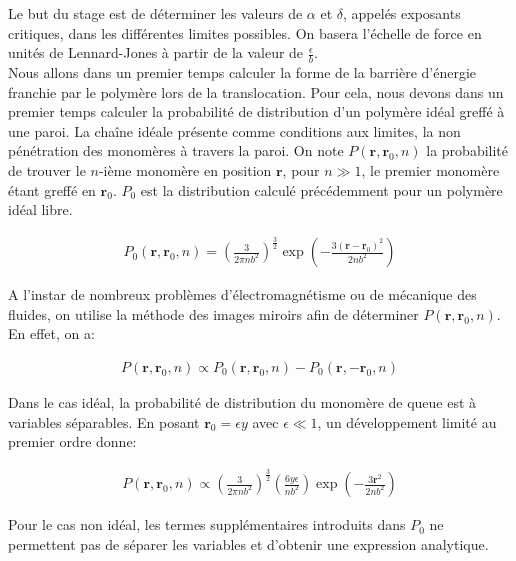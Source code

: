 \documentclass[a4paper,11pt]{article}
\begin{document}
 Le but du stage est de déterminer les valeurs de $\alpha$ et $\delta$, appelés exposants critiques, dans les différentes limites possibles. On basera l'échelle de force en unités de Lennard-Jones à partir de la valeur de $\frac{\epsilon}{b}$.\\

Nous allons dans un premier temps calculer la forme de la barrière d'énergie franchie par le polymère lors de la translocation. Pour cela, nous devons dans un premier temps calculer la probabilité de distribution d'un polymère idéal greffé à une paroi. La chaîne idéale présente comme conditions aux limites, la non pénétration des monomères à travers la paroi. On note $P(\textbf{r},\textbf{r}_0,n)$ la probabilité de trouver le $n$-ième monomère en position $\textbf{r}$, pour $n \gg 1$, le premier monomère étant greffé en $\textbf{r}_0$. $P_0$ est la distribution calculé précédemment pour un polymère idéal libre.

\begin{eqnarray}
P_0(\textbf{r},\textbf{r}_0,n)=\left(\frac{3}{2\pi n b^2}\right)^\frac{3}{2}\exp\left(-\frac{3(\textbf{r}-\textbf{r}_0)^2}{2 n b^2}\right)
\end{eqnarray}

A l'instar de nombreux problèmes d'électromagnétisme ou de mécanique des fluides, on utilise la méthode des images miroirs afin de déterminer $P(\textbf{r},\textbf{r}_0,n)$. En effet, on a:

\begin{eqnarray}
P(\textbf{r},\textbf{r}_0,n) \propto P_0(\textbf{r},\textbf{r}_0,n)-P_0(\textbf{r},-\textbf{r}_0,n)
\end{eqnarray}

Dans le cas idéal, la probabilité de distribution du monomère de queue est à variables séparables. En posant $\textbf{r}_0= \epsilon y$ avec $\epsilon \ll 1$, un développement limité au premier ordre donne:

\begin{eqnarray}
P(\textbf{r},\textbf{r}_0,n) \propto \left(\frac{3}{2\pi n b^2}\right)^\frac{3}{2} \left(\frac{6 y \epsilon}{n b^2}\right)\exp\left(-\frac{3\textbf{r}^2}{2 n b^2}\right)
\end{eqnarray}

Pour le cas non idéal, les termes supplémentaires introduits dans $P_0$ ne permettent pas de séparer les variables et d'obtenir une expression analytique.
\end{document}
